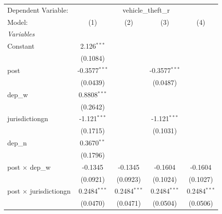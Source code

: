 \begingroup
\centering
\begin{tabular}{lcccc}
   \tabularnewline \midrule \midrule
   Dependent Variable: & \multicolumn{4}{c}{vehicle\_theft\_r}\\
   Model:                                          & (1)             & (2)            & (3)             & (4)\\  
   \midrule
   \emph{Variables}\\
   Constant                                        & 2.126$^{***}$   &                &                 &   \\   
                                                   & (0.1084)        &                &                 &   \\   
   post                                            & -0.3577$^{***}$ &                & -0.3577$^{***}$ &   \\   
                                                   & (0.0439)        &                & (0.0487)        &   \\   
   dep\_w                                          & 0.8808$^{***}$  &                &                 &   \\   
                                                   & (0.2642)        &                &                 &   \\   
   jurisdictiongn                                  & -1.121$^{***}$  &                & -1.121$^{***}$  &   \\   
                                                   & (0.1715)        &                & (0.1031)        &   \\   
   dep\_n                                          & 0.3670$^{**}$   &                &                 &   \\   
                                                   & (0.1796)        &                &                 &   \\   
   post $\times$ dep\_w                            & -0.1345         & -0.1345        & -0.1604         & -0.1604\\   
                                                   & (0.0921)        & (0.0923)       & (0.1024)        & (0.1027)\\   
   post $\times$ jurisdictiongn                    & 0.2484$^{***}$  & 0.2484$^{***}$ & 0.2484$^{***}$  & 0.2484$^{***}$\\   
                                                   & (0.0470)        & (0.0471)       & (0.0504)        & (0.0506)\\   

\end{tabular}
